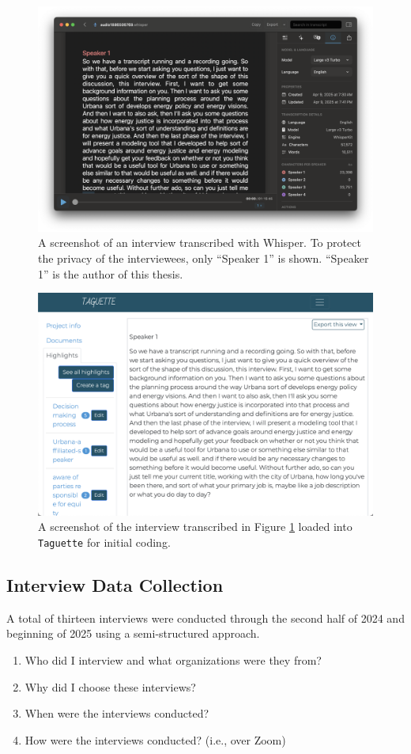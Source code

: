 \begin{figure}
    \centering
    \includegraphics[width=0.6\columnwidth]{figures/07_interview_chapter/whisper-screenshot.png}
    \caption{A screenshot of an interview transcribed with Whisper. To protect
    the privacy of the interviewees, only ``Speaker 1'' is shown. ``Speaker 1''
    is the author of this thesis.}
    \label{fig:whisper}
\end{figure}

\begin{figure}
    \centering
    \includegraphics[width=0.6\columnwidth]{figures/07_interview_chapter/taguette-screenshot}
    \caption{A screenshot of the interview transcribed in Figure \ref{fig:whisper}
    loaded into \texttt{Taguette} for initial coding.}
    \label{fig:taguette}
\end{figure}

\subsection{Interview Data Collection}

A total of thirteen interviews were conducted through the second half of 2024
and beginning of 2025 using a semi-structured approach.

\begin{enumerate}
    \item Who did I interview and what organizations were they from?
    \item Why did I choose these interviews?
    \item When were the interviews conducted?
    \item How were the interviews conducted? (i.e., over Zoom)
\end{enumerate}

